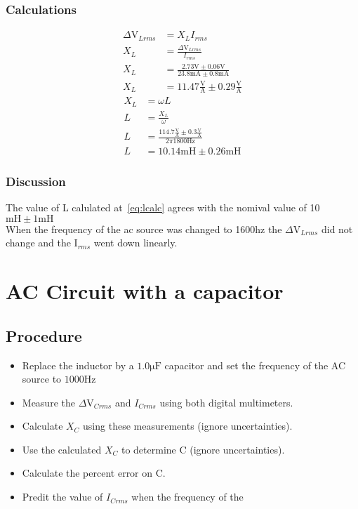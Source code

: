 \documentclass{report}
\begin{document}
\subsection{Calculations}
\begin{align}
    \Delta\si{\volt}_{Lrms}&=X_{L}I_{rms}\nonumber\\
    X_{L}&=\frac{\Delta\si{\volt}_{Lrms}}{I_{rms}}\nonumber\\
    X_{L}&=\frac{2.73\si{\volt}\pm0.06\si{\volt}}{23.8\si{\milli\ampere}\pm0.8\si{\milli\ampere}}\nonumber\\
    X_{L}&=11.47\frac{\si{\volt}}{\si{\ampere}} \pm 0.29 \frac{\si{\volt}}{\si{\ampere}} \label{eq:xlcalc}
\end{align}
\begin{align}
    X_{L}&=\omega L\nonumber\\
    L&=\frac{X_{L}}{\omega}\nonumber\\
    L&=\frac{114.7\frac{\si{\volt}}{\si{\ampere}} \pm 0.3 \frac{\si{\volt}}{\si{\ampere}}}{2\pi1800\si{\hertz}} \nonumber\\
    L&=10.14\si{\milli}\si{\henry} \pm 0.26\si{\milli}\si{\henry}\label{eq:lcalc}
\end{align}
\subsection{Discussion}
The value of L calulated at~\eqref{eq:lcalc} agrees with the nomival value of 10$\si{\milli}\si{\henry}\pm1\si{\milli}\si{\henry}$\\
When the frequency of the ac source was changed to 1600hz the $\Delta\si{\volt}_{Lrms}$ did not change and the I$_{rms}$ went down linearly.

\chapter{ AC Circuit with a capacitor}

\section{Procedure}

\begin{itemize}
    \item Replace the inductor by a $1.0\si{\micro\farad}$ capacitor and set the frequency of the AC source to $1000\si{\hertz}$
    \item Measure the $\Delta\si{\volt}_{Crms}$ and $I_{Crms}$ using both digital multimeters.
    \item Calculate $X_{C}$ using these measurements (ignore uncertainties).
    \item Use the calculated $X_{C}$ to determine C (ignore uncertainties).
    \item Calculate the percent error on C.
    \item Predit the value of $I_{Crms}$ when the frequency of the 
\end{itemize}
\end{document}
